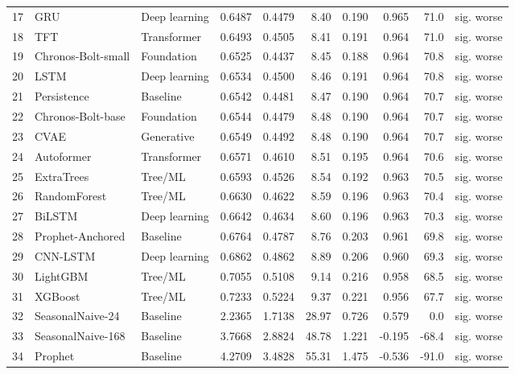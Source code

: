 \begin{table}[ht]
\begin{tabular}{lllrrrrrrr}
17 & GRU & Deep learning & 0.6487 & 0.4479 & 8.40 & 0.190 & 0.965 & 71.0 & sig. worse \\
18 & TFT & Transformer & 0.6493 & 0.4505 & 8.41 & 0.191 & 0.964 & 71.0 & sig. worse \\
19 & Chronos-Bolt-small & Foundation & 0.6525 & 0.4437 & 8.45 & 0.188 & 0.964 & 70.8 & sig. worse \\
20 & LSTM & Deep learning & 0.6534 & 0.4500 & 8.46 & 0.191 & 0.964 & 70.8 & sig. worse \\
21 & Persistence & Baseline & 0.6542 & 0.4481 & 8.47 & 0.190 & 0.964 & 70.7 & sig. worse \\
22 & Chronos-Bolt-base & Foundation & 0.6544 & 0.4479 & 8.48 & 0.190 & 0.964 & 70.7 & sig. worse \\
23 & CVAE & Generative & 0.6549 & 0.4492 & 8.48 & 0.190 & 0.964 & 70.7 & sig. worse \\
24 & Autoformer & Transformer & 0.6571 & 0.4610 & 8.51 & 0.195 & 0.964 & 70.6 & sig. worse \\
25 & ExtraTrees & Tree/ML & 0.6593 & 0.4526 & 8.54 & 0.192 & 0.963 & 70.5 & sig. worse \\
26 & RandomForest & Tree/ML & 0.6630 & 0.4622 & 8.59 & 0.196 & 0.963 & 70.4 & sig. worse \\
27 & BiLSTM & Deep learning & 0.6642 & 0.4634 & 8.60 & 0.196 & 0.963 & 70.3 & sig. worse \\
28 & Prophet-Anchored & Baseline & 0.6764 & 0.4787 & 8.76 & 0.203 & 0.961 & 69.8 & sig. worse \\
29 & CNN-LSTM & Deep learning & 0.6862 & 0.4862 & 8.89 & 0.206 & 0.960 & 69.3 & sig. worse \\
30 & LightGBM & Tree/ML & 0.7055 & 0.5108 & 9.14 & 0.216 & 0.958 & 68.5 & sig. worse \\
31 & XGBoost & Tree/ML & 0.7233 & 0.5224 & 9.37 & 0.221 & 0.956 & 67.7 & sig. worse \\
32 & SeasonalNaive-24 & Baseline & 2.2365 & 1.7138 & 28.97 & 0.726 & 0.579 & 0.0 & sig. worse \\
33 & SeasonalNaive-168 & Baseline & 3.7668 & 2.8824 & 48.78 & 1.221 & -0.195 & -68.4 & sig. worse \\
34 & Prophet & Baseline & 4.2709 & 3.4828 & 55.31 & 1.475 & -0.536 & -91.0 & sig. worse \\
\bottomrule
\end{tabular}
\end{table}